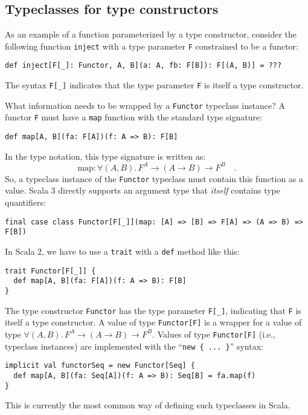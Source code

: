 \subsection{Typeclasses for type constructors\label{subsec:Typeclasses-for-type-constructors}}

As an example of a function parameterized by a type constructor, consider
the following function \lstinline!inject! with a type parameter \lstinline!F!
constrained to be a functor:
\begin{lstlisting}
def inject[F[_]: Functor, A, B](a: A, fb: F[B]): F[(A, B)] = ???
\end{lstlisting}
The syntax \lstinline!F[_]! indicates that the type parameter \lstinline!F!
is itself a type constructor. 

What information needs to be wrapped by a \lstinline!Functor! typeclass
instance? A functor \lstinline!F! must have a \lstinline!map! function
with the standard type signature:
\begin{lstlisting}
def map[A, B](fa: F[A])(f: A => B): F[B]
\end{lstlisting}
In the type notation, this type signature is written as:
\[
\text{map}:\forall(A,B).\,F^{A}\rightarrow\left(A\rightarrow B\right)\rightarrow F^{B}\quad.
\]
So, a typeclass instance of the \lstinline!Functor! typeclass must
contain this function as a value. Scala 3 directly supports an argument
type that \emph{itself} contains type quantifiers:
\begin{lstlisting}[mathescape=true]
final case class Functor[F[_]](map: [A] => [B] => F[A] => (A => B) => F[B])
\end{lstlisting}
In Scala 2, we have to use a \lstinline!trait! with a \lstinline!def!
method like this:
\begin{lstlisting}
trait Functor[F[_]] {
  def map[A, B](fa: F[A])(f: A => B): F[B]
}
\end{lstlisting}
The type constructor \lstinline!Functor! has the type parameter \lstinline!F[_]!,
indicating that \lstinline!F! is itself a type constructor. A value
of type \lstinline!Functor[F]! is a wrapper for a value of type $\forall(A,B).\,F^{A}\rightarrow\left(A\rightarrow B\right)\rightarrow F^{B}$.
Values of type \lstinline!Functor[F]! (i.e., typeclass instances)
are implemented with the \textsf{``}\lstinline!new { ... }!\textsf{''} syntax:
\begin{lstlisting}
implicit val functorSeq = new Functor[Seq] {
  def map[A, B](fa: Seq[A])(f: A => B): Seq[B] = fa.map(f)
}
\end{lstlisting}
This is currently the most common way of defining such typeclasses
in Scala.

